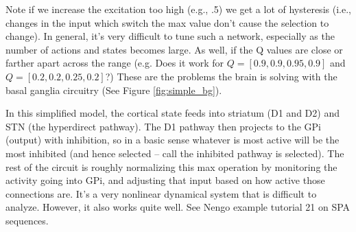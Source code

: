 \documentclass[10pt,letterpaper,oneside]{article}
\begin{document}
\cprotect{}

Note if we increase the excitation too high (e.g., .5) we get a lot of hysteresis (i.e., changes in the input which switch the max value don't cause the selection to change). In general, it's very difficult to tune such a network, especially as the number of actions and states becomes large. As well, if the Q values are close or farther apart across the range (e.g. Does it work for $Q =[0.9, 0.9, 0.95, 0.9]$ and $Q=[0.2, 0.2, 0.25, 0.2]$?) These are the problems the brain is solving with the basal ganglia circuitry (See Figure \ref{fig:simple_bg}).

In this simplified model, the cortical state feeds into striatum (D1 and D2) and STN (the hyperdirect pathway). The D1 pathway then projects to the GPi (output) with inhibition, so in a basic sense whatever is most active will be the most inhibited (and hence selected -- call the inhibited pathway is selected). The rest of the circuit is roughly normalizing this max operation by monitoring the activity going into GPi, and adjusting that input based on how active those connections are. It's a very nonlinear dynamical system that is difficult to analyze.  However, it also works quite well. See Nengo example tutorial 21 on SPA sequences. 
\end{document}
